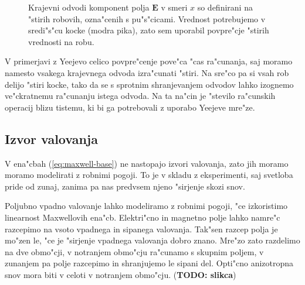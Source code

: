 \documentclass[a4paper,10pt]{article}
\newcommand{\todo}[1]{(\textbf{\textsc{TODO}: #1})}
\renewcommand{\vec}{\mathbf}
\newcommand{\E}{\vec E}
\begin{document}
\begin{figure}[h]
\centering
 \caption{
 Krajevni odvodi komponent polja $\E$ v smeri $x$ so definirani na "stirih robovih, ozna"cenih s pu"s"cicami. 
 Vrednost potrebujemo v sredi"s"cu kocke (modra pika), zato sem uporabil povpre"cje "stirih vrednosti na robu. 
 }
 \label{fig:lattice-derivatives}
\end{figure}

V primerjavi z Yeejevo celico povpre"cenje pove"ca "cas ra"cunanja, saj moramo namesto vsakega krajevnega odvoda izra"cunati "stiri. 
Na sre"co pa si vsah rob delijo "stiri kocke, tako da se s sprotnim shranjevanjem odvodov lahko izognemo ve"ckratnemu ra"cunanju istega odvoda. 
Na ta na"cin je "stevilo ra"cunskih operacij blizu tistemu, ki bi ga potrebovali z uporabo Yeejeve mre"ze. 

\subsection{Izvor valovanja}

V ena"cbah (\ref{eq:maxwell-base}) ne nastopajo izvori valovanja, zato jih moramo moramo modelirati z robnimi pogoji. 
To je v skladu z eksperimenti, saj svetloba pride od zunaj, zanima pa nas predvsem njeno "sirjenje skozi snov. 

Poljubno vpadno valovanje lahko modeliramo z robnimi pogoji, "ce izkoristimo linearnost Maxwellovih ena"cb. 
Elektri"cno in magnetno polje lahko namre"c razcepimo na vsoto vpadnega in sipanega valovanja\cite{taflove}. 
Tak"sen razcep polja je mo"zen le, "ce je "sirjenje vpadnega valovanja dobro znano. 
Mre"zo zato razdelimo na dve obmo"cji, v notranjem obmo"cju ra"cunamo s skupnim poljem, v zunanjem pa polje razcepimo in shranjujemo le sipani del.
Opti"cno anizotropna snov mora biti v celoti v notranjem obmo"cju. \todo{slikca}
\end{document}
